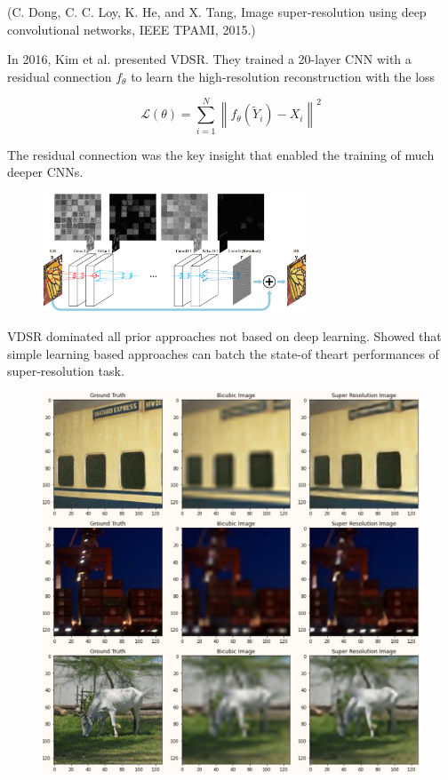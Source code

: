 \documentclass{report}
\begin{document}
\begin{definition}[8.6][SRCNN]
    (C. Dong, C. C. Loy, K. He, and X. Tang, Image super-resolution using deep convolutional networks, IEEE TPAMI, 2015.)
\end{definition}

\begin{definition}[8.7][VDSR]
    In 2016, Kim et al. presented VDSR. They trained a 20-layer CNN with a residual connection $f_{\theta}$ to learn the high-resolution reconstruction with the loss

    $$
    \mathcal{L}(\theta)=\sum_{i=1}^{N}\left\|f_{\theta}\left(\tilde{Y}_{i}\right)-X_{i}\right\|^{2}
    $$

    The residual connection was the key insight that enabled the training of much deeper CNNs.

    \begin{figure}[H]
        \centering
        \includegraphics[width=0.7\textwidth]{.././assets/8.5.png}
    \end{figure}

    \par\noindent\textcolor{gray}{\hdashrule{\textwidth}{0.4pt}{1pt 2pt}}

    VDSR dominated all prior approaches not based on deep learning.
    Showed that simple learning based approaches can batch the state-of theart performances of super-resolution task.

    \begin{figure}[H]
        \centering
        \includegraphics[width=1.0\textwidth]{.././assets/8.6.png}
    \end{figure}


\end{definition}
\end{document}
